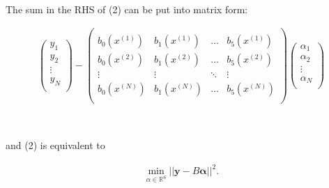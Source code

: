 \documentclass[]{article}
\begin{document}
\begin{itemize}
 \ 

 The sum in the RHS of (2) can be put into matrix form:
 
 \begin{align}
     \begin{pmatrix} y_1 \\ y_2 \\ \vdots \\ y_N \\[.25 em]  \end{pmatrix} -
      \begin{pmatrix}
        \\[-.75em]
        b_0\left(x^{(1)}\right) & b_1\left(x^{(1)}\right) & ... &  b_5\left(x^{(1)}\right)   \\[.5em]
        b_0\left(x^{(2)}\right) & b_1\left(x^{(2)}\right) & ...  & b_5\left(x^{(2)}\right)  \\[.5em]
        \vdots & \vdots & \ddots & \vdots  \\[.5em]
        b_0\left(x^{(N)}\right) & b_1\left(x^{(N)}\right) &...  &  b_5\left(x^{(N)}\right)   \\[.5em]
        \end{pmatrix}
        \begin{pmatrix} \alpha_1 \\ \alpha_2 \\ \vdots \\ \alpha_N \\[.25 em]  \end{pmatrix}
 \end{align}

\ 

and (2) is equivalent to 


\begin{align}
    \min\limits_{\alpha \in \mathbb{R}^6 } ||{\bm y}-B{\bm \alpha}||^2. 
\end{align}
 \end{itemize}
\end{document}
